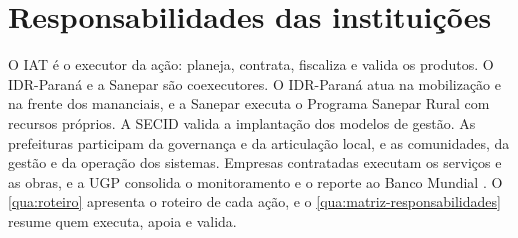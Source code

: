 \section{Responsabilidades das instituições}
\label{sec:responsabilidades}

O IAT é o executor da ação: planeja, contrata, fiscaliza e valida os produtos.
O IDR-Paraná e a Sanepar são coexecutores. O IDR-Paraná atua na mobilização e
na frente dos mananciais, e a Sanepar executa o Programa Sanepar Rural com
recursos próprios. A SECID valida a implantação dos modelos de gestão. As
prefeituras participam da governança e da articulação local, e as comunidades,
da gestão e da operação dos sistemas. Empresas contratadas executam os
serviços e as obras, e a UGP consolida o monitoramento e o reporte ao Banco
Mundial \cite{mop2026}. O \autoref{qua:roteiro} apresenta o roteiro de cada
ação, e o \autoref{qua:matriz-responsabilidades} resume quem executa, apoia e
valida.

